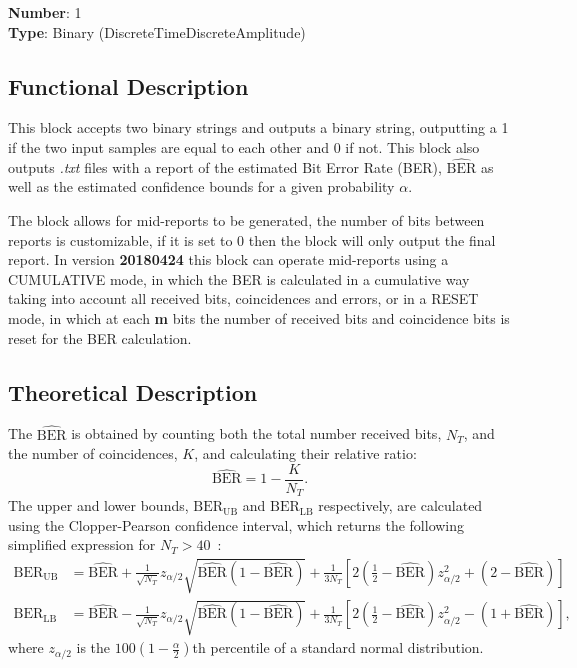 \begin{refsection}
\textbf{Number}: 1\\
\textbf{Type}: Binary (DiscreteTimeDiscreteAmplitude)

\subsection*{Functional Description}

This block accepts two binary strings and outputs a binary string, outputting a 1 if the two input samples are equal to each other and 0 if not. This block also outputs \textit{.txt} files with a report of the estimated Bit Error Rate (BER), $\widehat{\text{BER}}$ as well as the estimated confidence bounds for a given probability $\alpha$.
\par
The block allows for mid-reports to be generated, the number of bits between reports is customizable, if it is set to 0 then the block will only output the final report. In version \textbf{20180424} this block can operate mid-reports using a CUMULATIVE mode, in which the BER is calculated in a cumulative way taking into account all received bits, coincidences and errors, or in a RESET mode, in which at each \textbf{m} bits the number of received bits and coincidence bits is reset for the BER calculation.

\subsection*{Theoretical Description}\label{bercalc}
The $\widehat{\text{BER}}$ is obtained by counting both the total number received bits, $N_T$, and the number of coincidences, $K$, and calculating their relative ratio:
\begin{equation}
\widehat{\text{BER}}=1-\frac{K}{N_T}.
\end{equation}
The upper and lower bounds, $\text{BER}_\text{UB}$ and $\text{BER}_\text{LB}$ respectively, are calculated using the Clopper-Pearson confidence interval, which returns the following simplified expression for $N_T>40$~\cite{Almeida16}:
\begin{align}
\text{BER}_\text{UB}&=\widehat{\text{BER}}+\frac{1}{\sqrt{N_T}}z_{\alpha/2}\sqrt{\widehat{\text{BER}}(1-\widehat{\text{BER}})}+\frac{1}{3N_T}\left[2\left(\frac{1}{2}-\widehat{\text{BER}}\right)z_{\alpha/2}^2+(2-\widehat{\text{BER}})\right]\\
\text{BER}_\text{LB}&=\widehat{\text{BER}}-\frac{1}{\sqrt{N_T}}z_{\alpha/2}\sqrt{\widehat{\text{BER}}(1-\widehat{\text{BER}})}+\frac{1}{3N_T}\left[2\left(\frac{1}{2}-\widehat{\text{BER}}\right)z_{\alpha/2}^2-(1+\widehat{\text{BER}})\right],
\end{align}
where $z_{\alpha/2}$ is the $100\left(1-\frac{\alpha}{2}\right)$th percentile of a standard normal distribution.



\clearpage
\printbibliography[heading=subbibliography]
\end{refsection}
\cleardoublepage
